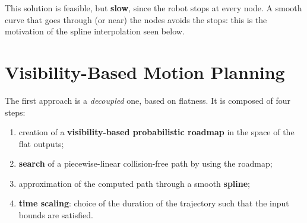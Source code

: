 \documentclass[10pt, a4paper]{report}
\begin{document}
\noindent This solution is feasible, but \textbf{slow}, since the robot stops at every node. A smooth curve that goes through (or near) the nodes avoids the stops: this is the motivation of the spline interpolation seen below.
\section{Visibility-Based Motion Planning}
The first approach is a \textit{decoupled} one, based on flatness. It is composed of four steps:\begin{enumerate}
    \item creation of a \textbf{visibility-based probabilistic roadmap} in the space of the flat outputs;
    \item \textbf{search} of a piecewise-linear collision-free path by using the roadmap;
    \item approximation of the computed path through a smooth \textbf{spline};
    \item \textbf{time scaling}: choice of the duration of the trajectory such that the input bounds are satisfied.
\end{enumerate}
\end{document}
